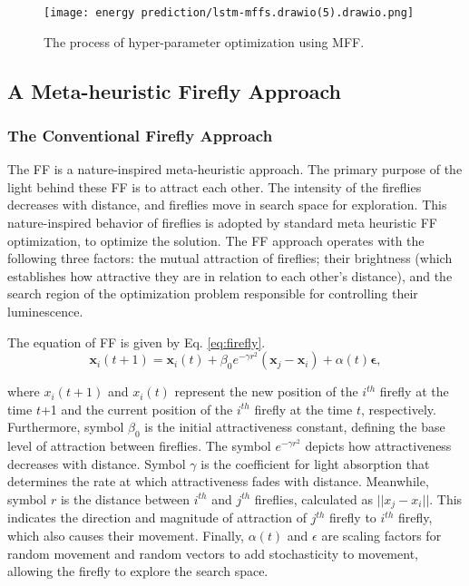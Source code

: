 \documentclass[journal]{IEEEtran}
\begin{document}
 

\begin{figure}[!h]
    \centering
    \texttt{[image: energy prediction/lstm-mffs.drawio(5).drawio.png]}
    \caption{The process of hyper-parameter optimization using MFF.}
    \label{fig:A deep Learning Framework using LSTM and Modified Firefly}
\end{figure}



\subsection{A Meta-heuristic Firefly Approach}

\subsubsection{The Conventional Firefly Approach}
The FF is a nature-inspired meta-heuristic approach. The primary purpose of the light behind these FF is to attract each other. The intensity of the fireflies decreases with distance, and fireflies move in search space for exploration. This nature-inspired behavior of fireflies is adopted by standard meta heuristic FF optimization, to optimize the solution. The FF approach operates with the following three factors: the mutual attraction of fireflies; their brightness (which establishes how attractive they are in relation to each other's distance), and the search region of the optimization problem responsible for controlling their luminescence. 


The equation of FF is given by Eq. \eqref{eq:firefly}.
\begin{equation}
\mathbf{x}_i(t+1) = \mathbf{x}_i(t) + \beta_0 e^{-\gamma r^2} (\mathbf{x}_j - \mathbf{x}_i) + \alpha(t) \mathbf{\epsilon},
\label{eq:firefly}
\end{equation}


where ${x}_i(t+1)$ and ${x}_i(t)$ represent the new position of the $i^{th}$ firefly at the time $t$+1 and the current position of the $i^{th}$ firefly at the time $t$, respectively. Furthermore, symbol $\beta_0$ is the initial attractiveness constant, defining the base level of attraction between fireflies. The symbol $e^{-\gamma r^2}$  depicts how attractiveness decreases with distance. Symbol $\gamma$ is the coefficient for light absorption that determines the rate at which attractiveness fades with distance. Meanwhile, symbol $r$ is the distance between $i^{th}$ and $j^{th}$ fireflies, calculated as $||{x}_j - {x}_i||$. This indicates the direction and magnitude of attraction of $j^{th}$ firefly to $i^{th}$ firefly, which also causes their movement. Finally, $\alpha(t)$ and ${\epsilon}$ are scaling factors for random movement and random vectors to add stochasticity to movement, allowing the firefly to explore the search space.
\end{document}
